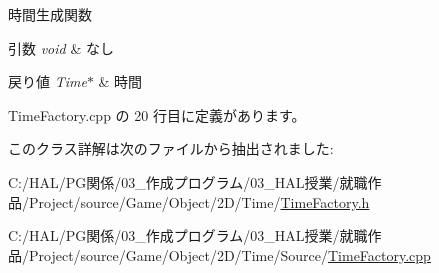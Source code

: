 時間生成関数 


\begin{DoxyParams}{引数}
{\em void} & なし \\
\hline
\end{DoxyParams}

\begin{DoxyRetVals}{戻り値}
{\em Time$\ast$} & 時間 \\
\hline
\end{DoxyRetVals}


 Time\+Factory.\+cpp の 20 行目に定義があります。



このクラス詳解は次のファイルから抽出されました\+:\begin{DoxyCompactItemize}
\item 
C\+:/\+H\+A\+L/\+P\+G関係/03\+\_\+作成プログラム/03\+\_\+\+H\+A\+L授業/就職作品/\+Project/source/\+Game/\+Object/2\+D/\+Time/\mbox{\hyperlink{_time_factory_8h}{Time\+Factory.\+h}}\item 
C\+:/\+H\+A\+L/\+P\+G関係/03\+\_\+作成プログラム/03\+\_\+\+H\+A\+L授業/就職作品/\+Project/source/\+Game/\+Object/2\+D/\+Time/\+Source/\mbox{\hyperlink{_time_factory_8cpp}{Time\+Factory.\+cpp}}\end{DoxyCompactItemize}
